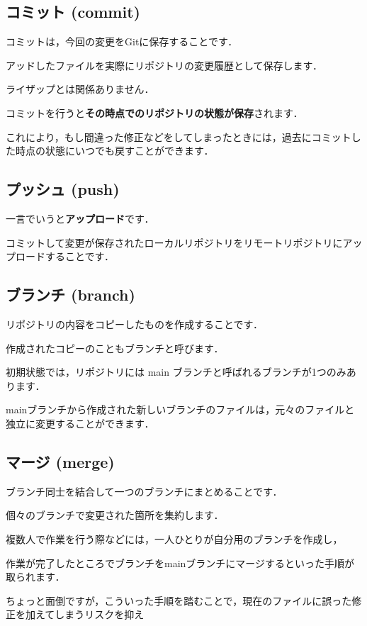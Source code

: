 \subsection{コミット (commit)}

コミットは，今回の変更をGitに保存することです．

アッドしたファイルを実際にリポジトリの変更履歴として保存します．

ライザップとは関係ありません．


コミットを行うと\textbf{その時点でのリポジトリの状態が保存}されます．

これにより，もし間違った修正などをしてしまったときには，過去にコミットした時点の状態にいつでも戻すことができます．


\subsection{プッシュ (push)}

一言でいうと\textbf{アップロード}です．

コミットして変更が保存されたローカルリポジトリをリモートリポジトリにアップロードすることです．


\subsection{ブランチ (branch)}

リポジトリの内容をコピーしたものを作成することです．

作成されたコピーのこともブランチと呼びます．

初期状態では，リポジトリには main ブランチと呼ばれるブランチが1つのみあります．

mainブランチから作成された新しいブランチのファイルは，元々のファイルと独立に変更することができます．


\subsection{マージ (merge)}

ブランチ同士を結合して一つのブランチにまとめることです．

個々のブランチで変更された箇所を集約します．

複数人で作業を行う際などには，一人ひとりが自分用のブランチを作成し，

作業が完了したところでブランチをmainブランチにマージするといった手順が取られます．

ちょっと面倒ですが，こういった手順を踏むことで，現在のファイルに誤った修正を加えてしまうリスクを抑え

